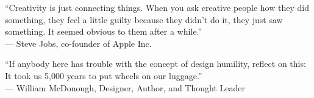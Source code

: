 
\begin{dedication} 

``Creativity is just connecting things. When you ask creative people how they did something, they feel a little guilty because they didn’t do it, they just saw something. It seemed obvious to them after a while.'' \\
— Steve Jobs, co-founder of Apple Inc.\newline \newline

``If anybody here has trouble with the concept of design humility, reflect on this: It took us 5,000 years to put wheels on our luggage.'' \\
— William McDonough, Designer, Author, and Thought Leader


\end{dedication}